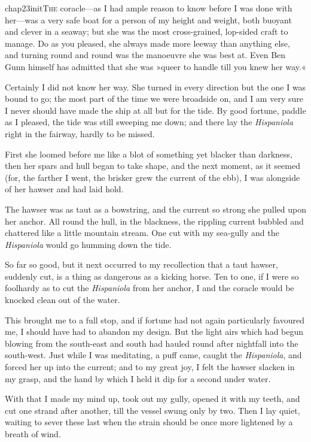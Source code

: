 
   \lettrine[lines=4,image=true]{chap23initT}{he} coracle—as I had ample reason to know before I was done with her—was a very safe boat for a person of my height and weight, both buoyant and clever in a seaway; but she was the most cross-grained, lop-sided craft to manage. Do as you pleased, she always made more leeway than anything else, and turning round and round was the manoeuvre she was best at. Even Ben Gunn himself has admitted that she was »queer to handle till you knew her way.«

Certainly I did not know her way. She turned in every direction but the one I was bound to go; the most part of the time we were broadside on, and I am very sure I never should have made the ship at all but for the tide. By good fortune, paddle as I pleased, the tide was still sweeping me down; and there lay the \textit{Hispaniola} right in the fairway, hardly to be missed.

First she loomed before me like a blot of something yet blacker than darkness, then her spars and hull began to take shape, and the next moment, as it seemed (for, the farther I went, the brisker grew the current of the ebb), I was alongside of her hawser and had laid hold.

The hawser was as taut as a bowstring, and the current so strong she pulled upon her anchor. All round the hull, in the blackness, the rippling current bubbled and chattered like a little mountain stream. One cut with my sea-gully and the \textit{Hispaniola} would go humming down the tide.

So far so good, but it next occurred to my recollection that a taut hawser, suddenly cut, is a thing as dangerous as a kicking horse. Ten to one, if I were so foolhardy as to cut the \textit{Hispaniola} from her anchor, I and the coracle would be knocked clean out of the water.

This brought me to a full stop, and if fortune had not again particularly favoured me, I should have had to abandon my design. But the light airs which had begun blowing from the south-east and south had hauled round after nightfall into the south-west. Just while I was meditating, a puff came, caught the \textit{Hispaniola}, and forced her up into the current; and to my great joy, I felt the hawser slacken in my grasp, and the hand by which I held it dip for a second under water.

With that I made my mind up, took out my gully, opened it with my teeth, and cut one strand after another, till the vessel swung only by two. Then I lay quiet, waiting to sever these last when the strain should be once more lightened by a breath of wind.

